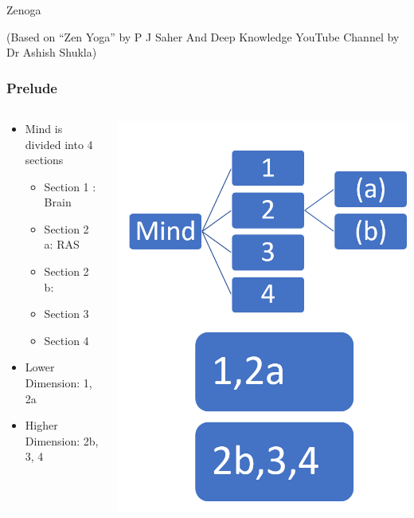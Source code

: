 \begin{frame}[fragile]\frametitle{}
\begin{center}
{\Large Zenoga}


{\tiny (Based on ``Zen Yoga'' by P J Saher And Deep Knowledge YouTube Channel by Dr Ashish Shukla)}
\end{center}
\end{frame}


\begin{frame}[fragile]
\frametitle{Prelude}

\begin{columns}[T] %
\begin{column}{.48\textwidth}
\begin{itemize}
\item Mind is divided into 4 sections
	\begin{itemize}
	\item Section 1 : Brain
	\item Section 2 a: RAS
	\item Section 2 b:
	\item Section 3
	\item Section 4
	\end{itemize}
\item Lower Dimension: 1, 2a
\item Higher Dimension: 2b, 3, 4
\end{itemize}
\end{column}%
\hfill%
\begin{column}{.48\textwidth}
 \begin{center}
\includegraphics[width=0.9\linewidth,keepaspectratio]{images/zenyoga1}

\end{center}
\end{column}
\end{columns}
\end{frame}
